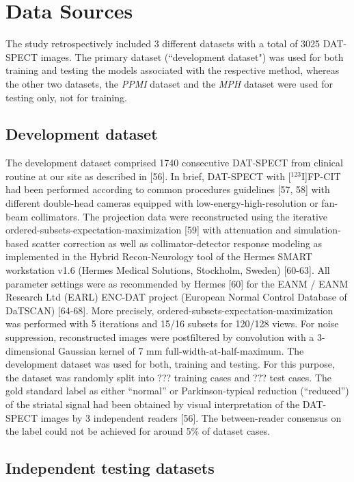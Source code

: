 \section{Data Sources}
\label{sec:data}

The study retrospectively included 3 different datasets with a total of 3025 DAT-SPECT images.
The primary dataset (``development dataset") was used for both training and testing the models associated with the respective method, 
whereas the other two datasets, the \textit{PPMI} dataset and the \textit{MPH} dataset were used for testing only, not for training.

\subsection{Development dataset}
\label{subsec:spect_dataset}

The development dataset comprised 1740 consecutive DAT-SPECT from clinical routine at our site as described in [56]. 
In brief, DAT-SPECT with [$^{123}$I]FP-CIT had been performed according to common procedures guidelines [57, 58] with different double-head cameras 
equipped with low-energy-high-resolution or fan-beam collimators. 
The projection data were reconstructed using the iterative ordered-subsets-expectation-maximization [59] with attenuation and simulation-based scatter correction 
as well as collimator-detector response modeling as implemented in the Hybrid Recon-Neurology tool of the Hermes SMART workstation v1.6 (Hermes Medical Solutions, Stockholm, Sweden) [60-63]. 
All parameter settings were as recommended by Hermes [60] for the EANM / EANM Research Ltd (EARL) ENC-DAT project (European Normal Control Database of DaTSCAN) [64-68]. 
More precisely, ordered-subsets-expectation-maximization was performed with 5 iterations and 15/16 subsets for 120/128 views. 
For noise suppression, reconstructed images were postfiltered by convolution with a 3-dimensional Gaussian kernel of 7 mm full-width-at-half-maximum. 
The development dataset was used for both, training and testing. For this purpose, the dataset was randomly split into ??? training cases and ??? test cases. 
The gold standard label as either “normal” or Parkinson-typical reduction (“reduced”) of the striatal signal had been obtained by visual interpretation of the DAT-SPECT images by 3 independent readers [56]. 
The between-reader consensus on the label could not be achieved for around 5\% of dataset cases.

\subsection{Independent testing datasets}
\label{subsec:external_dataset}

